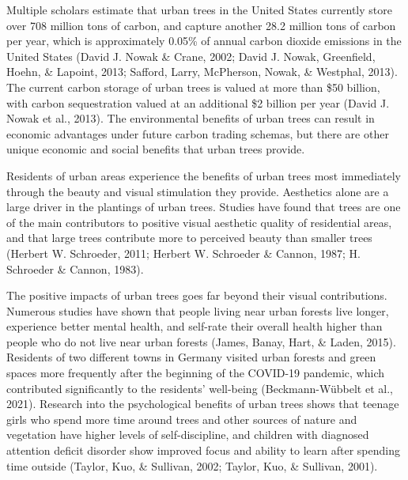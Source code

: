 \documentclass[12pt,twoside]{reedthesis}
\begin{document}
Multiple scholars estimate that urban trees in the United States currently store over 708 million tons of carbon, and capture another 28.2 million tons of carbon per year, which is approximately 0.05\% of annual carbon dioxide emissions in the United States (David J. Nowak \& Crane, 2002; David J. Nowak, Greenfield, Hoehn, \& Lapoint, 2013; Safford, Larry, McPherson, Nowak, \& Westphal, 2013). The current carbon storage of urban trees is valued at more than \$50 billion, with carbon sequestration valued at an additional \$2 billion per year (David J. Nowak et al., 2013). The environmental benefits of urban trees can result in economic advantages under future carbon trading schemas, but there are other unique economic and social benefits that urban trees provide.

Residents of urban areas experience the benefits of urban trees most immediately through the beauty and visual stimulation they provide. Aesthetics alone are a large driver in the plantings of urban trees. Studies have found that trees are one of the main contributors to positive visual aesthetic quality of residential areas, and that large trees contribute more to perceived beauty than smaller trees (Herbert W. Schroeder, 2011; Herbert W. Schroeder \& Cannon, 1987; H. Schroeder \& Cannon, 1983).

The positive impacts of urban trees goes far beyond their visual contributions. Numerous studies have shown that people living near urban forests live longer, experience better mental health, and self-rate their overall health higher than people who do not live near urban forests (James, Banay, Hart, \& Laden, 2015). Residents of two different towns in Germany visited urban forests and green spaces more frequently after the beginning of the COVID-19 pandemic, which contributed significantly to the residents' well-being (Beckmann-Wübbelt et al., 2021). Research into the psychological benefits of urban trees shows that teenage girls who spend more time around trees and other sources of nature and vegetation have higher levels of self-discipline, and children with diagnosed attention deficit disorder show improved focus and ability to learn after spending time outside (Taylor, Kuo, \& Sullivan, 2002; Taylor, Kuo, \& Sullivan, 2001).
\end{document}
